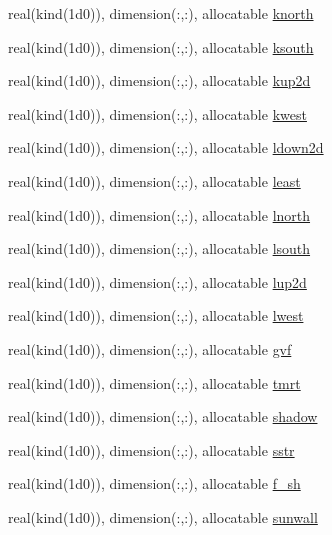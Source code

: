 \begin{DoxyCompactItemize}
\item 
real(kind(1d0)), dimension(\+:,\+:), allocatable \hyperlink{namespacematsize_aeee3798c5f6672da6ea25aa8787b4ab4}{knorth}
\item 
real(kind(1d0)), dimension(\+:,\+:), allocatable \hyperlink{namespacematsize_ad03d6ca2c8d26a947785c9dc94aa61db}{ksouth}
\item 
real(kind(1d0)), dimension(\+:,\+:), allocatable \hyperlink{namespacematsize_a6f666c13da51f22100a0043f53e724ca}{kup2d}
\item 
real(kind(1d0)), dimension(\+:,\+:), allocatable \hyperlink{namespacematsize_ac52a8cfa3a58b4aff078294cbdb70ed5}{kwest}
\item 
real(kind(1d0)), dimension(\+:,\+:), allocatable \hyperlink{namespacematsize_aaf966c70b77fe5646eb3ca89701232e8}{ldown2d}
\item 
real(kind(1d0)), dimension(\+:,\+:), allocatable \hyperlink{namespacematsize_aa87a43379aac21f08eec99b01c93823a}{least}
\item 
real(kind(1d0)), dimension(\+:,\+:), allocatable \hyperlink{namespacematsize_a5adfcfca2aa462e55a6ed15deb4c0138}{lnorth}
\item 
real(kind(1d0)), dimension(\+:,\+:), allocatable \hyperlink{namespacematsize_aa28ab3bf60483b5f18b3785b75b8f859}{lsouth}
\item 
real(kind(1d0)), dimension(\+:,\+:), allocatable \hyperlink{namespacematsize_a3337225f5c7bd795ed48fc7811611a59}{lup2d}
\item 
real(kind(1d0)), dimension(\+:,\+:), allocatable \hyperlink{namespacematsize_a8fe9b02501cb74972025943f45f742b1}{lwest}
\item 
real(kind(1d0)), dimension(\+:,\+:), allocatable \hyperlink{namespacematsize_a30597ac2227214d3724f34f551f3c904}{gvf}
\item 
real(kind(1d0)), dimension(\+:,\+:), allocatable \hyperlink{namespacematsize_a9154a4703b2d439f695e33201e46f231}{tmrt}
\item 
real(kind(1d0)), dimension(\+:,\+:), allocatable \hyperlink{namespacematsize_a3d9d89d00fce455db2334993b50c5e74}{shadow}
\item 
real(kind(1d0)), dimension(\+:,\+:), allocatable \hyperlink{namespacematsize_acd84773bbc050ab317186fe55d403afe}{sstr}
\item 
real(kind(1d0)), dimension(\+:,\+:), allocatable \hyperlink{namespacematsize_a6ab950e24bfe92c823016e8ed6e52873}{f\+\_\+sh}
\item 
real(kind(1d0)), dimension(\+:,\+:), allocatable \hyperlink{namespacematsize_acb0719b5e8d656e7faaac0470f8b9008}{sunwall}

\end{DoxyCompactItemize}
